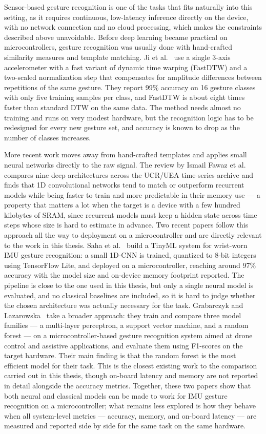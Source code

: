Sensor-based gesture recognition is one of the tasks that fits naturally into this setting, as it requires continuous, low-latency inference directly on the device, with no network connection and no cloud processing, which makes the constraints described above unavoidable. Before deep learning became practical on microcontrollers, gesture recognition was usually done with hand-crafted similarity measures and template matching. Ji et al.~\cite{ji2015gesture} use a single 3-axis accelerometer with a fast variant of dynamic time warping (FastDTW) and a two-scaled normalization step that compensates for amplitude differences between repetitions of the same gesture. They report 99\% accuracy on 16 gesture classes with only five training samples per class, and FastDTW is about eight times faster than standard DTW on the same data. The method needs almost no training and runs on very modest hardware, but the recognition logic has to be redesigned for every new gesture set, and accuracy is known to drop as the number of classes increases.

More recent work moves away from hand-crafted templates and applies small neural networks directly to the raw signal. The review by Ismail Fawaz et al.~\cite{fawaz2019tsc} compares nine deep architectures across the UCR/UEA time-series archive and finds that 1D convolutional networks tend to match or outperform recurrent models while being faster to train and more predictable in their memory use --- a property that matters a lot when the target is a device with a few hundred kilobytes of SRAM, since recurrent models must keep a hidden state across time steps whose size is hard to estimate in advance. Two recent papers follow this approach all the way to deployment on a microcontroller and are directly relevant to the work in this thesis. Saha et al.~\cite{saha2024wrist} build a TinyML system for wrist-worn IMU gesture recognition: a small 1D-CNN is trained, quantized to 8-bit integers using TensorFlow Lite, and deployed on a microcontroller, reaching around 97\% accuracy with the model size and on-device memory footprint reported. The pipeline is close to the one used in this thesis, but only a single neural model is evaluated, and no classical baselines are included, so it is hard to judge whether the chosen architecture was actually necessary for the task. Grabarczyk and Lazarowska~\cite{grabarczyk2025} take a broader approach: they train and compare three model families --- a multi-layer perceptron, a support vector machine, and a random forest --- on a microcontroller-based gesture recognition system aimed at drone control and assistive applications, and evaluate them using F1-scores on the target hardware. Their main finding is that the random forest is the most efficient model for their task. This is the closest existing work to the comparison carried out in this thesis, though on-board latency and memory are not reported in detail alongside the accuracy metrics. Together, these two papers show that both neural and classical models can be made to work for IMU gesture recognition on a microcontroller; what remains less explored is how they behave when all system-level metrics --- accuracy, memory, and on-board latency --- are measured and reported side by side for the same task on the same hardware.

